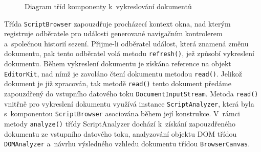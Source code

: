 \begin{figure}[H]
  \begin{center}
    \caption{Diagram tříd komponenty k~vykreslování dokumentů}
    \label{Figure.ScriptBrowserUserAgent}
  \end{center}
\end{figure}

Třída \texttt{ScriptBrowser} zapouzdřuje procházecí kontext okna, nad kterým registruje odběratele pro události generované navigačním kontrolerem a~společnou historií sezení. Přijme-li odběratel událost, která znamená změnu dokumentu, pak tento odběratel volá metodu \texttt{refresh()}, jež způsobí vykreslení dokumentu. Během vykreslení dokumentu je získána reference na objekt \texttt{EditorKit}, nad nímž je zavoláno čtení dokumentu metodou \texttt{read()}. Jelikož dokument je již zpracován, tak metodě \texttt{read()} tento dokument předáme zapouzdřený do vstupního datového toku \texttt{DocumentInputStream}. Metoda \texttt{read()} vnitřně pro vykreslení dokumentu využívá instance \texttt{ScriptAnalyzer}, která byla s~komponentou \texttt{ScriptBrowser} asociována během její konstrukce. V~rámci metody \texttt{analyze()} třídy ScriptAnalyzer dochází k~získání zapouzdřeného dokumentu ze vstupního datového toku, analyzování objektu DOM třídou \texttt{DOMAnalyzer} a~návrhu výsledného vzhledu dokumentu třídou \texttt{BrowserCanvas}.

